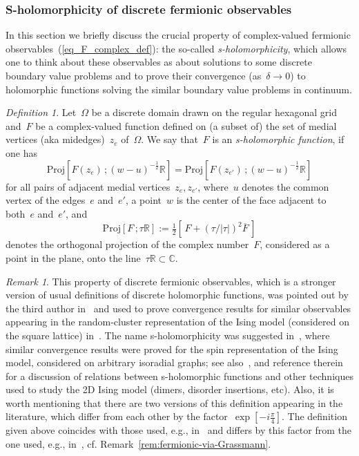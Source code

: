 \documentclass[reqno,11pt,a4paper]{amsart}
\theoremstyle{remark}
\newtheorem{definition}[proposition]{Definition}
\newtheorem{remark}[proposition]{Remark}
\newcommand{\R}{\mathbb{R}}
\newcommand{\C}{\mathbb{C}}
\begin{document}
\subsubsection{S-holomorphicity of discrete fermionic observables} \label{sub:s-holomorphicity}
In this section we briefly discuss the crucial property of complex-valued fermionic observables~(\ref{eq_F_complex_def}): the so-called \emph{s-holomorphicity}, which allows one to think about these observables as about solutions to some discrete boundary value problems and to prove their convergence (as~$\delta\to 0$) to holomorphic functions solving the similar boundary value problems in continuum.
\begin{definition}
\label{def:s-hol}
Let~$\Omega$ be a discrete domain drawn on the regular hexagonal grid and~$F$ be a complex-valued function defined on (a subset of) the set of medial vertices (aka midedges)~$z_e$ of~$\Omega$. We say that~$F$ is an \emph{s-holomorphic function}, if one has
\begin{equation}
\label{eq:s-hol-rel}
	\mathrm{Proj}[F(z_e)\,;(w-u)^{-\frac{1}{2}}\R]=\mathrm{Proj}[F(z_{e'})\,;(w-u)^{-\frac{1}{2}}\R]
\end{equation}
for all pairs of adjacent medial vertices~$z_e,z_{e'}$, where~$u$ denotes the common vertex of the edges~$e$ and~$e'$, a point~$w$ is the center of the face adjacent to both~$e$ and~$e'$, and
\[
\mathrm{Proj}[F\,;\tau\R]:=\tfrac{1}{2}[\,F+(\tau/|\tau|)^2\overline{F}\,]
\]
denotes the orthogonal projection of the complex number~$F$, considered as a point in the plane, onto the line~$\tau\R\subset\C$.
\end{definition}

\begin{remark}
	This property of discrete fermionic observables, which is a stronger version of usual definitions of discrete holomorphic functions, was pointed out by the third author in~\cite{Smi06} and used to prove convergence results for similar observables appearing in the random-cluster representation of the Ising model (considered on the square lattice) in~\cite{Smi10}. The name \mbox{s-holomorphicity} was suggested in~\cite[Section~3]{CheSmi12}, where similar convergence results were proved for the spin representation of the Ising model, considered on arbitrary isoradial graphs; see also~\cite[Section~4]{Smi10a}, \cite[Section~3]{CheCimKas15} and reference therein for a discussion of relations between s-holomorphic functions and other techniques used to study the 2D Ising model (dimers, disorder insertions, etc). Also, it is worth mentioning that there are two versions of this definition appearing in the literature, which differ from each other by the factor~$\exp[-i\frac{\pi}{4}]$. The definition given above coincides with those used, e.g., in~\cite{HonSmi13,Hon10,CheHonIzy15} and differs by this factor from the one used, e.g., in~\cite{Smi10,CheSmi12,CheIzy13,CheCimKas15}, cf. Remark~\ref{rem:fermionic-via-Grassmann}.
\end{remark}
\end{document}

